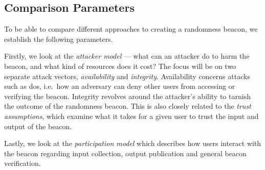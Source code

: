 \subsection{Comparison Parameters}
\label{sub:comparison_parameters}
To be able to compare different approaches to creating a randomness beacon, we establish the following parameters.

Firstly, we look at the \emph{attacker model} ---
what can an attacker do to harm the beacon, and what kind of resources does it cost?
The focus will be on two separate attack vectors, \emph{availability} and \emph{integrity}.
Availability concerns attacks such as \gls{dos}, i.e.\ how an adversary can deny other users from accessing or verifying the beacon.
Integrity revolves around the attacker's ability to tarnish the outcome of the randomness beacon.
This is also closely related to the \emph{trust assumptions}, which examine what it takes for a given user to trust the input and output of the beacon.

Lastly, we look at the \emph{participation model} which describes how users interact with the beacon regarding input collection, output publication and general beacon verification.
